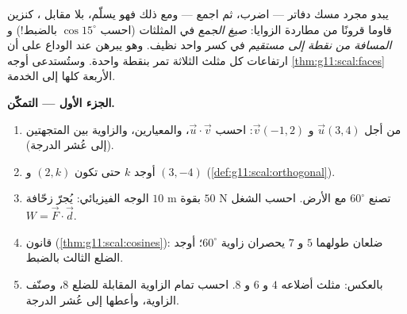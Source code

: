 \begin{problem}
\label{pb:g11:scal:1}
يبدو  مجرد مسك دفاتر --- اضرب، ثم اجمع ---
ومع ذلك فهو يسلّم، بلا مقابل ، كنزين
قاوما قرونًا من مطاردة الزوايا: \emph{صيغ الجمع}
في المثلثات (احسب $\cos 15^\circ$ بالضبط!) و
\emph{المسافة من نقطة إلى مستقيم} في كسر واحد نظيف. وهو
يبرهن عند الوداع على أن ارتفاعات كل مثلث الثلاثة
تمر بنقطة واحدة. وستُستدعى أوجه
\cref{thm:g11:scal:faces} الأربعة كلها إلى الخدمة.

\medskip
\noindent\textbf{الجزء الأول --- التمكّن.}
\begin{enumerate}
  \item من أجل $\vec u(3, 4)$ و $\vec v(-1, 2)$: احسب
        $\vec u \cdot \vec v$، والمعيارين، والزاوية
        بين المتجهتين (إلى عُشر الدرجة).
  \item أوجد $k$ حتى تكون $(2, k)$ و $(3, -4)$ 
        (\cref{def:g11:scal:orthogonal}).
  \item الوجه الفيزيائي: يُجرّ زحّافة $10$ m بقوة $50$ N
        تصنع $60^\circ$ مع الأرض. احسب الشغل
        $W = \vec F \cdot \vec d$.
  \item قانون  (\cref{thm:g11:scal:cosines}): ضلعان
        طولهما $5$ و $7$ يحصران زاوية $60^\circ$؛ أوجد
        الضلع الثالث بالضبط.
  \item بالعكس: مثلث أضلاعه $4$ و $6$ و $8$. احسب
         تمام الزاوية المقابلة للضلع $8$، وصنّف
        الزاوية، وأعطها إلى عُشر الدرجة.
\end{enumerate}


\end{problem}
